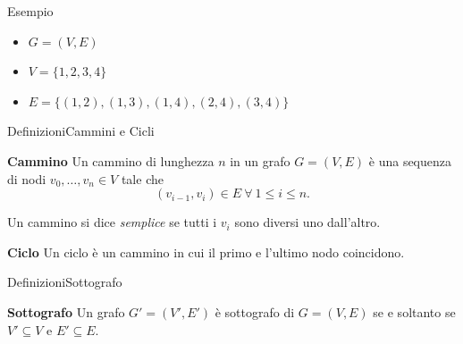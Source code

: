 \documentclass[compress]{beamer}
\begin{document}
\begin{frame}{}
    \begin{exampleblock}{Esempio}
    \begin{itemize}
    \item $G = (V, E)$
    \item $V = \{1, 2, 3, 4\}$
    \item $E = \{(1,2), (1,3), (1,4), (2,4), (3,4)\}$
    \end{itemize}
  \end{exampleblock}
  \begin{center}
  
  \end{center}
\end{frame}

\begin{frame}{Definizioni}{Cammini e Cicli}
  \begin{block}{\textbf{Cammino}}
    Un cammino di lunghezza $n$ in un grafo $G = (V, E)$ \`e una sequenza di nodi $v_0, \dots, v_n \in V$ tale che 
    \[
        (v_{i-1}, v_i) \in E \ \forall \ 1 \leq i \leq n.
    \]

    Un cammino si dice \emph{semplice} se tutti i $v_i$ sono diversi uno dall'altro.
  \end{block}
  \pause
  \begin{block}{\textbf{Ciclo}}
    Un ciclo \`e un cammino in cui il primo e l'ultimo nodo coincidono.
  \end{block}
\end{frame}

\begin{frame}{Definizioni}{Sottografo}
  \begin{block}{\textbf{Sottografo}}
    Un grafo $G' = (V', E')$ \`e sottografo di $G = (V, E)$ se e soltanto se $V' \subseteq V$ e $E' \subseteq E$.
  \end{block}
  \begin{columns}
  \begin{center}
  \scalebox{0.7}{}
  \end{center}
  \begin{center}
  \scalebox{0.7}{}
  \end{center}
  \end{columns}
\end{frame}
\end{document}
